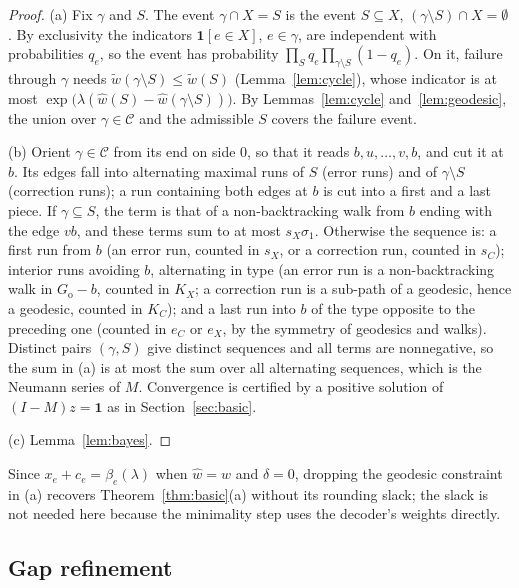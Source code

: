 \documentclass[11pt]{article}
\theoremstyle{plain}
\theoremstyle{definition}
\theoremstyle{remark}
\newcommand{\Go}{G_{\mathrm{o}}}
\newcommand{\cC}{\mathcal{C}}
\newcommand{\tw}{\tilde w}
\newcommand{\hw}{\hat w}
\newcommand{\one}{\mathbf 1}
\renewcommand{\_}{\oldunderscore\allowbreak}
\begin{document}
\begin{proof}
(a) Fix $\gamma$ and $S$. The event $\gamma\cap X=S$ is the event $S\subseteq X$, $(\gamma\setminus S)\cap X=\emptyset$. By exclusivity the indicators $\one[e\in X]$, $e\in\gamma$, are independent with probabilities $q_e$, so the event has probability $\prod_Sq_e\prod_{\gamma\setminus S}(1-q_e)$. On it, failure through $\gamma$ needs $\tw(\gamma\setminus S)\le\tw(S)$ (Lemma~\ref{lem:cycle}), whose indicator is at most $\exp\big(\lambda(\hw(S)-\hw(\gamma\setminus S))\big)$. By Lemmas~\ref{lem:cycle} and~\ref{lem:geodesic}, the union over $\gamma\in\cC$ and the admissible $S$ covers the failure event.

(b) Orient $\gamma\in\cC$ from its end on side $0$, so that it reads $b,u,\dots,v,b$, and cut it at $b$. Its edges fall into alternating maximal runs of $S$ (error runs) and of $\gamma\setminus S$ (correction runs); a run containing both edges at $b$ is cut into a first and a last piece. If $\gamma\subseteq S$, the term is that of a non-backtracking walk from $b$ ending with the edge $vb$, and these terms sum to at most $s_X\sigma_1$. Otherwise the sequence is: a first run from $b$ (an error run, counted in $s_X$, or a correction run, counted in $s_C$); interior runs avoiding $b$, alternating in type (an error run is a non-backtracking walk in $\Go-b$, counted in $K_X$; a correction run is a sub-path of a geodesic, hence a geodesic, counted in $K_C$); and a last run into $b$ of the type opposite to the preceding one (counted in $e_C$ or $e_X$, by the symmetry of geodesics and walks). Distinct pairs $(\gamma,S)$ give distinct sequences and all terms are nonnegative, so the sum in (a) is at most the sum over all alternating sequences, which is the Neumann series of $M$. Convergence is certified by a positive solution of $(I-M)z=\one$ as in Section~\ref{sec:basic}.

(c) Lemma~\ref{lem:bayes}.
\end{proof}

\noindent Since $x_e+c_e=\beta_e(\lambda)$ when $\hw=w$ and $\delta=0$, dropping the geodesic constraint in (a) recovers Theorem~\ref{thm:basic}(a) without its rounding slack; the slack is not needed here because the minimality step uses the decoder's weights directly.

\subsection{Gap refinement}
\end{document}
